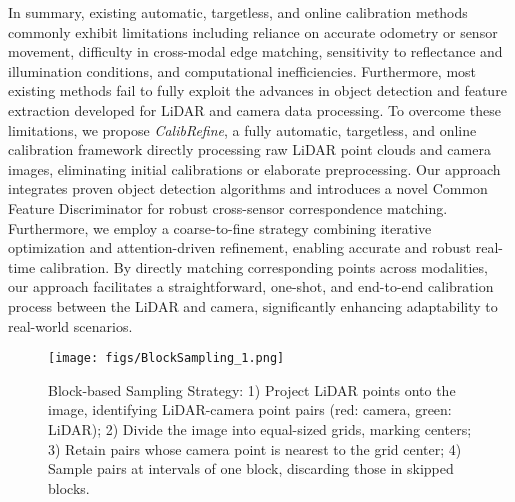 In summary, existing automatic, targetless, and online calibration methods commonly exhibit limitations including reliance on accurate odometry or sensor movement, difficulty in cross-modal edge matching, sensitivity to reflectance and illumination conditions, and computational inefficiencies. Furthermore,  most existing methods fail to fully exploit the advances in object detection and feature extraction developed for LiDAR and camera data processing.
To overcome these limitations, we propose \emph{CalibRefine}, a fully automatic, targetless, and online calibration framework directly processing raw LiDAR point clouds and camera images, eliminating initial calibrations or elaborate preprocessing. Our approach integrates proven object detection algorithms and introduces a novel Common Feature Discriminator for robust cross-sensor correspondence matching. Furthermore, we employ a coarse-to-fine strategy combining iterative optimization and attention-driven refinement, enabling accurate and robust real-time calibration. By directly matching corresponding points across modalities, our approach facilitates a straightforward, one-shot, and end-to-end calibration process between the LiDAR and camera, significantly enhancing adaptability to real-world scenarios.


\begin{figure*}[]
	\centering
	\texttt{[image: figs/BlockSampling\_1.png]}
	\caption{Block-based Sampling Strategy: 1) Project LiDAR points onto the image, identifying LiDAR-camera point pairs (red: camera, green: LiDAR); 2) Divide the image into equal-sized grids, marking centers; 3) Retain pairs whose camera point is nearest to the grid center; 4) Sample pairs at intervals of one block, discarding those in skipped blocks.}
	\label{BlockSampling}
\end{figure*}